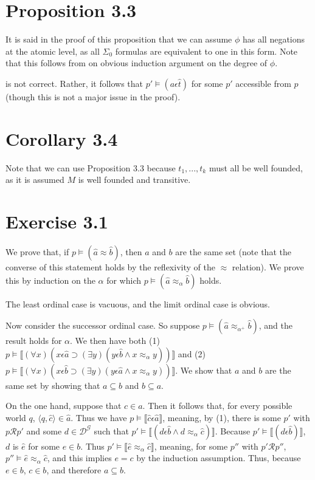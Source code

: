 \documentclass{article}
\newcommand{\lbc}{\llbracket}
\newcommand{\rbc}{\rrbracket}
\theoremstyle{definition}
\begin{document}
\section*{Proposition 3.3}
It is said in the proof of this proposition that we can assume $\phi$ has all negations at the atomic level, as 
all $\Sigma_0$ formulas are equivalent to one in this form. Note that this follows from on obvious induction argument 
on the degree of $\phi$.

 is not correct. Rather, it follows that 
$p'\vDash (a\epsilon\hat{t})$ for some $p'$ accessible from $p$ (though this is not a major issue in the 
proof).

\section*{Corollary 3.4}
Note that we can use Proposition 3.3 because $t_1,...,t_k$ must all be well founded, as it is assumed $M$ is well 
founded and transitive.

\section*{Exercise 3.1}
We prove that, if $p\vDash(\hat{a}\approx\hat{b})$, then $a$ and $b$ are the same set (note that the converse of 
this statement holds by the reflexivity of the $\approx$ relation). We prove this by 
induction on the $\alpha$ for which $p\vDash(\hat{a}\approx_\alpha\hat{b})$ holds.

The least ordinal case is vacuous, and the limit ordinal case is obvious.

Now consider the successor ordinal case. So suppose $p\vDash(\hat{a}\approx_{\alpha^+}\hat{b})$, and the 
result holds for $\alpha$. We then have both
(1) $p\vDash\lbc(\forall x)(x\epsilon\hat{a}\supset(\exists y)(y\epsilon\hat{b}\wedge x\approx_\alpha y))\rbc$ 
and (2) $p\vDash\lbc(\forall x)(x\epsilon\hat{b}\supset(\exists y)(y\epsilon\hat{a}\wedge x\approx_\alpha y))\rbc$.
We show that $a$ and $b$ are the same set by showing that $a\subseteq b$ and $b\subseteq a$.

On the one hand, suppose that $c\in a$. Then it follows that, for every possible world $q$, 
$\langle q,\hat{c}\rangle\in\hat{a}$. Thus we have $p\vDash\lbc\hat{c}\epsilon\hat{a}\rbc$, 
meaning, by (1), there is some $p'$ with $p\mathcal{R}p'$ and some $d\in\mathcal{D}^\mathcal{G}$ such that
$p'\vDash\lbc(d\epsilon\hat{b}\wedge d\approx_\alpha\hat{c})\rbc$. Because $p'\vDash\lbc (d\epsilon\hat{b})\rbc$, 
$d$ is $\hat{e}$ for some $e\in b$. Thus $p'\vDash\lbc\hat{e}\approx_\alpha\hat{c}\rbc$, meaning, 
for some $p''$ with $p'\mathcal{R}p''$, $p''\vDash\hat{e}\approx_\alpha\hat{c}$, and this 
implies $e=c$ by the induction assumption. Thus, because $e\in b$, $c\in b$, and therefore 
$a\subseteq b$.
\end{document}
